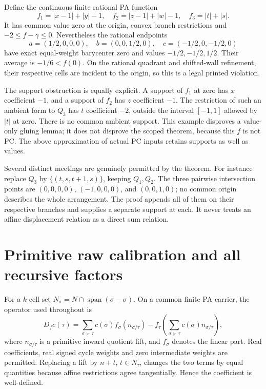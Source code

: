 \documentclass[11pt]{article}
\begin{document}
Define the continuous finite rational PA function
\[
 f_1=|x-1|+|y|-1,\quad f_2=|z-1|+|w|-1,\quad f_3=|t|+|s|.
\]
It has common value zero at the origin, convex branch restrictions and $-2\leq f-\gamma\leq0$. Nevertheless the rational endpoints
\[
 a=(1/2,0,0,0),\quad b=(0,0,1/2,0),\quad
 c=(-1/2,0,-1/2,0)
\]
have exact equal-weight barycenter zero and values $-1/2,-1/2,1/2$. Their average is $-1/6<f(0)$. On the rational quadrant and shifted-wall refinement, their respective cells are incident to the origin, so this is a legal printed violation.

The support obstruction is equally explicit. A support of $f_1$ at zero has $x$ coefficient $-1$, and a support of $f_2$ has $z$ coefficient $-1$. The restriction of such an ambient form to $Q_3$ has $t$ coefficient $-2$, outside the interval $[-1,1]$ allowed by $|t|$ at zero. There is no common ambient support. This example disproves a value-only gluing lemma; it does not disprove the scoped theorem, because this $f$ is not PC. The above approximation of actual PC inputs retains supports as well as values.

Several distinct meetings are genuinely permitted by the theorem. For instance replace $Q_3$ by $\{(t,s,t+1,s)\}$, keeping $Q_1,Q_2$. The three pairwise intersection points are $(0,0,0,0)$, $(-1,0,0,0)$, and $(0,0,1,0)$; no common origin describes the whole arrangement. The proof appends all of them on their respective branches and supplies a separate support at each. It never treats an affine displacement relation as a direct sum relation.

\section{Primitive raw calibration and all recursive factors}\label{rawsection}
For a $k$-cell set $N_\sigma=N\cap\operatorname{span}(\sigma-\sigma)$. On a common finite PA carrier, the operator used throughout is
\begin{equation}\label{raw}
 D_fc(\tau)=\sum_{\sigma\succ\tau}c(\sigma)f_\sigma(n_{\sigma/\tau})
 -f_\tau\left(\sum_{\sigma\succ\tau}c(\sigma)n_{\sigma/\tau}\right),
\end{equation}
where $n_{\sigma/\tau}$ is a primitive inward quotient lift, and $f_\sigma$ denotes the linear part. Real coefficients, real signed cycle weights and zero intermediate weights are permitted. Replacing a lift by $n+t$, $t\in N_\tau$, changes the two terms by equal quantities because affine restrictions agree tangentially. Hence the coefficient is well-defined.
\end{document}
